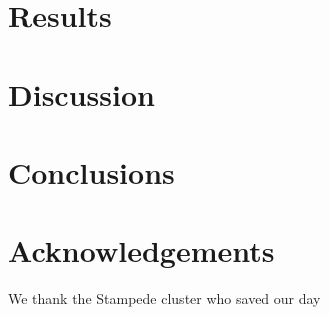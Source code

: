\documentclass[reprint,aps,prd,superscriptaddress,showkeys]{revtex4-1}
\begin{document}
\section{Results}


\section{Discussion}


\section{Conclusions}

 

\section*{Acknowledgements}
We thank the Stampede cluster who saved our day


\label{lastpage}
\end{document}
